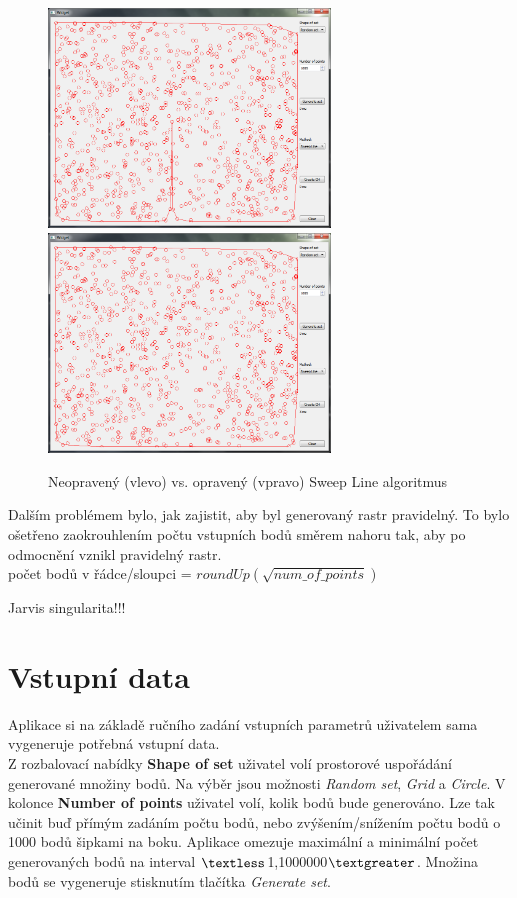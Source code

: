 \documentclass[a4paper, 12pt]{article}
\begin{document}
\begin{figure} [h!]
    \centering
      \includegraphics[width=7.5cm]{./pictures/app_sweep_wrong.png}
      \includegraphics[width=7.5cm]{./pictures/app_sweep_right.png}
      \caption{Neopravený (vlevo) vs. opravený (vpravo) Sweep Line algoritmus}
\end{figure}

Dalším problémem bylo, jak zajistit, aby byl generovaný rastr pravidelný. To bylo ošetřeno zaokrouhlením počtu vstupních bodů směrem nahoru tak, aby po odmocnění vznikl pravidelný rastr.\\

počet bodů v řádce/sloupci = $roundUp(\sqrt{num\_of\_points})$


Jarvis singularita!!!




\section{Vstupní data}
Aplikace si na základě ručního zadání vstupních parametrů uživatelem sama vygeneruje potřebná vstupní data. \\

Z rozbalovací nabídky \textbf{Shape of set} uživatel volí prostorové uspořádání generované množiny bodů. Na výběr jsou možnosti \textit{Random set}, \textit{Grid} a \textit{Circle}. V kolonce \textbf{Number of points} uživatel volí, kolik bodů bude generováno. Lze tak učinit buď přímým zadáním počtu bodů, nebo zvýšením/snížením počtu bodů o 1000 bodů šipkami na boku. Aplikace omezuje maximální a minimální počet generovaných bodů na interval $\textless$1,1000000$\textgreater$. Množina bodů se vygeneruje stisknutím tlačítka \textsl{Generate set}.\\
\end{document}
